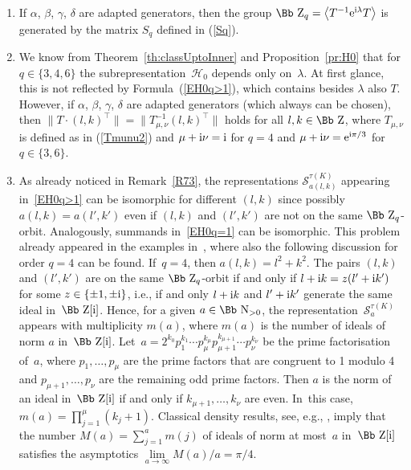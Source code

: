 \documentclass[10pt,a4paper]{amsart}
\newcommand\NN{{\mbox{\Bb N}}}
\newcommand\ZZ{{\mbox{\Bb Z}}}
\newcommand\cH{{\mathcal H}}
\newcommand\la{\langle}
\newcommand\ra{\rangle}
\numberwithin{equation}{section}
\begin{document}
\begin{Remark}\label{fR}\quad
\begin{enumerate}\itemsep=0pt
\item If $\alpha$, $\beta$, $\gamma$, $\delta$ are adapted generators, then the group $\ZZ_q=\big\la T^{-1} {\rm e}^{{\rm i}\lambda} T\big\ra$ is generated by the matrix $S_q$ defined in (\ref{Sq}).
\item We know from Theorem~\ref{th:classUptoInner} and Proposition~\ref{pr:H0} that
for $q\in\{3,4,6\}$ the subrepresentation~$\cH_0$ depends only on~$\lambda$. At first glance, this is not reflected by Formula~(\ref{EH0q>1}), which contains besides $\lambda$ also $T$. However, if $\alpha$, $\beta$, $\gamma$, $\delta$ are adapted generators (which always can be chosen), then
$\big\| T\cdot(l,k)^\top \big\|=\big\|T_{\mu,\nu}^{-1}(l,k)^\top\big\|$ holds for all $l,k\in\ZZ$, where $T_{\mu,\nu}$ is defined as in (\ref{Tmunu2}) and $\mu+{\rm i}\nu={\rm i}$ for $q=4$ and $\mu+{\rm i}\nu={\rm e}^{{\rm i}\pi/3}$ for $q\in\{3,6\}$.
\item As already noticed in Remark~\ref{R73}, the representations ${\mathcal S}_{a(l,k)}^{\tau(K)}$ appearing in~\eqref{EH0q>1} can be isomorphic for different $(l,k)$ since possibly $a(l,k)=a(l',k')$ even if $(l,k)$ and $(l',k')$ are not on the same $\ZZ_q$-orbit. Analogously, summands in~\eqref{EH0q=1} can be isomorphic. This problem already appeared in the examples in~\cite{Br}, where also the following discussion for order $q=4$ can be found. If~$q=4$, then $a(l,k)=l^2+k^2$. The pairs $(l,k)$ and $(l',k')$ are on the same $\ZZ_q$-orbit if and only if $l+{\rm i}k=z(l'+{\rm i}k')$ for some $z\in\{\pm1,\pm {\rm i}\}$, i.e., if and only $l+{\rm i}k$ and $l'+{\rm i}k'$ generate the same ideal in~$\ZZ[{\rm i}]$. Hence, for a given $a\in\NN_{>0}$, the representation~${\mathcal S}_a^{\tau(K)}$ appears with multiplicity $m(a)$, where $m(a)$ is the number of ideals of norm $a$ in~$\ZZ[{\rm i}]$. Let~$a=2^{k_0}p_1^{k_1}\cdots p_\mu^{k_\mu} p_{\mu+1}^{k_{\mu+1}} \cdots p_\nu^{k_\nu}$ be the prime factorisation of~$a$, where $p_1,\dots, p_\mu$ are the prime factors that are congruent to 1 modulo 4 and $p_{\mu+1},\dots,p_\nu$ are the remaining odd prime factors. Then $a$ is the norm of an ideal in~$\ZZ[{\rm i}]$ if and only if $k_{\mu+1},\dots,k_\nu$ are even. In~this case, $m(a)=\prod_{j=1}^\mu(k_j+1)$. Classical density results, see, e.g., \cite[Section~40]{H}, imply that the number $M(a)=\sum_{j=1}^a m(j)$ of ideals of norm at most~$a$ in~$\ZZ[{\rm i}]$ satisfies the asymptotics $\lim\limits_{a\to \infty}M(a)/a=\pi/4$.
\end{enumerate}
\end{Remark}
\end{document}

